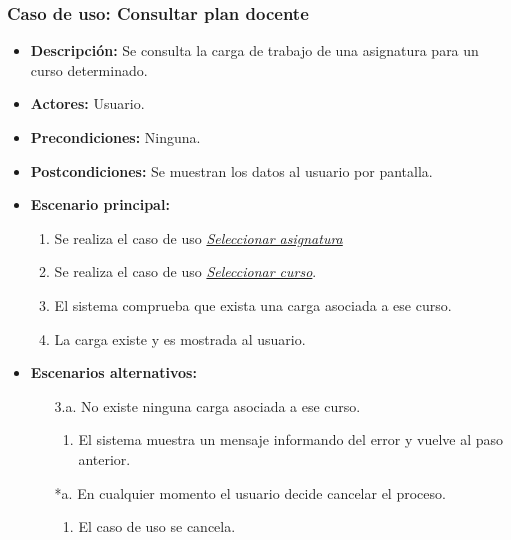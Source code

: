 \documentclass{book}
\begin{document}
\subsubsection*{Caso de uso: Consultar plan docente}
\begin{itemize}
\item{\bf Descripción:} Se consulta la carga de trabajo de una asignatura para un curso determinado.
\item{\bf Actores:} Usuario.
\item{\bf Precondiciones:} Ninguna.
\item{\bf Postcondiciones:} Se muestran los datos al usuario por pantalla.
\item{\bf Escenario principal:}
	\begin{enumerate}
	\item Se realiza el caso de uso {\em \hyperref[select_asignatura]{Seleccionar asignatura}}
	\item Se realiza el caso de uso {\em \hyperref[select_curso]{Seleccionar curso}}.
	\item El sistema comprueba que exista una carga asociada a ese curso.
	\item La carga existe y es mostrada al usuario.
	\end{enumerate}
\item{\bf Escenarios alternativos:}
	\begin{itemize}
	\item[3.a.]No existe ninguna carga asociada a ese curso.
		\begin{enumerate}
		\item El sistema muestra un mensaje informando del error y vuelve al paso anterior.
		\end{enumerate}
	\item[*a.]En cualquier momento el usuario decide cancelar el proceso.
		\begin{enumerate}
		\item El caso de uso se cancela.
		\end{enumerate}		
	\end{itemize}
\end{itemize}
\end{document}
